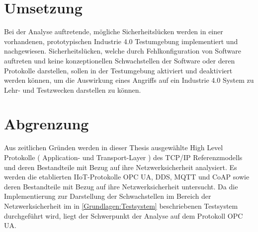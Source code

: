 \section{Umsetzung}
Bei der Analyse auftretende, mögliche Sicherheitslücken werden in einer vorhandenen, prototypischen Industrie 4.0 Testumgebung \cite{Weber2018} implementiert und nachgewiesen. Sicherheitslücken, welche durch Fehlkonfiguration von Software auftreten und keine konzeptionellen Schwachstellen der Software oder deren Protokolle darstellen, sollen in der Testumgebung aktiviert und deaktiviert werden können, um die Auswirkung eines Angriffs auf ein Industrie 4.0 System zu Lehr- und Testzwecken darstellen zu können.

\section{Abgrenzung}
Aus zeitlichen Gründen werden in dieser Thesis ausgewählte High Level Protokolle ( Application- und Transport-Layer ) des TCP/IP Referenzmodells und deren Bestandteile mit Bezug auf ihre Netzwerksicherheit analysiert. Es werden die etablierten \ac{IIoT}-Protokolle OPC UA, DDS, MQTT und CoAP sowie deren Bestandteile mit Bezug auf ihre Netzwerksicherheit untersucht. Da die Implementierung zur Darstellung der Schwachstellen im Bereich der Netzwerksicherheit im in \autoref{Grundlagen:Testsystem} beschriebenen Testsystem durchgeführt wird, liegt der Schwerpunkt der Analyse auf dem Protokoll OPC UA.